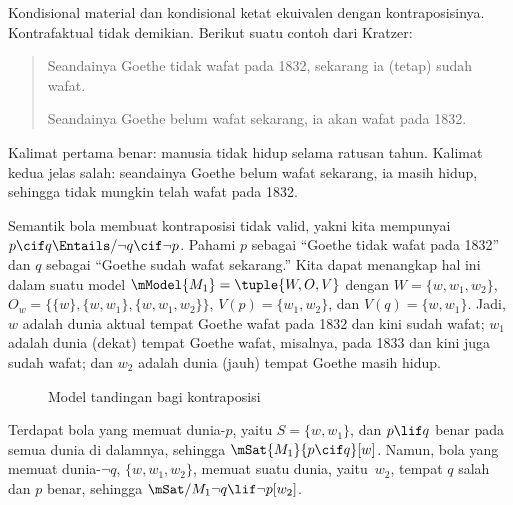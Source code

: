 \documentclass[../../../include/open-logic-section]{subfiles}
\begin{document}


Kondisional material dan kondisional ketat ekuivalen dengan kontraposisinya.
Kontrafaktual tidak demikian. Berikut suatu contoh dari Kratzer:
\begin{quote}
  Seandainya Goethe tidak wafat pada 1832, sekarang ia (tetap) sudah wafat.

  Seandainya Goethe belum wafat sekarang, ia akan wafat pada 1832.
\end{quote}
Kalimat pertama benar: manusia tidak hidup selama ratusan tahun. Kalimat
kedua jelas salah: seandainya Goethe belum wafat sekarang, ia masih hidup,
sehingga tidak mungkin telah wafat pada 1832.

\begin{ex}
  Semantik bola membuat kontraposisi tidak valid, yakni kita mempunyai $p
  \cif q \Entails/ \lnot q \cif \lnot p$. Pahami $p$ sebagai ``Goethe tidak
  wafat pada 1832'' dan $q$ sebagai ``Goethe sudah wafat sekarang.'' Kita
  dapat menangkap hal ini dalam suatu model $\mModel{M_1} = \tuple{W, O, V}$
  dengan $W = \{w, w_1, w_2\}$, $O_w = \{\{w\}, \{w, w_1\}, \{w, w_1,
  w_2\}\}$, $V(p) = \{w_1, w_2\}$, dan $V(q) = \{w, w_1\}$. Jadi, $w$
  adalah dunia aktual tempat Goethe wafat pada 1832 dan kini sudah wafat;
  $w_1$ adalah dunia (dekat) tempat Goethe wafat, misalnya, pada 1833 dan kini
  juga sudah wafat; dan $w_2$ adalah dunia (jauh) tempat Goethe masih hidup.
\begin{figure}
\begin{center}
\caption{Model tandingan bagi kontraposisi}
\end{center}
\end{figure}
Terdapat bola yang memuat dunia-$p$, yaitu $S = \{w, w_1\}$, dan $p \lif q$
benar pada semua dunia di dalamnya, sehingga $\mSat{M_1}{p \cif q}[w]$.
Namun, bola yang memuat dunia-$\lnot q$, $\{w, w_1, w_2\}$, memuat suatu
dunia, yaitu~$w_2$, tempat $q$ salah dan $p$ benar, sehingga
$\mSat/{M_1}{\lnot q \lif \lnot p}[w_2]$.
\end{ex}
\end{document}

